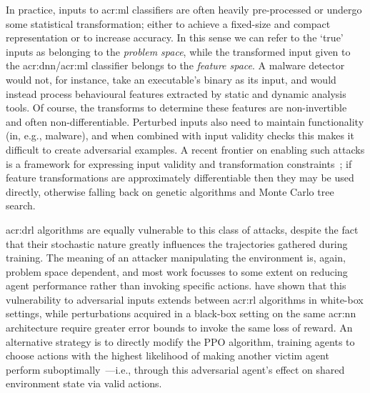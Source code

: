 In practice, inputs to \gls{acr:ml} classifiers are often heavily pre-processed or undergo some statistical transformation; either to achieve a fixed-size and compact representation or to increase accuracy.
In this sense we can refer to the `true' inputs as belonging to the \emph{problem space}, while the transformed input given to the \gls{acr:dnn}/\gls{acr:ml} classifier belongs to the \emph{feature space}.
A malware detector would not, for instance, take an executable's binary as its input, and would instead process behavioural features extracted by static and dynamic analysis tools. 
Of course, the transforms to determine these features are non-invertible and often non-differentiable.
Perturbed inputs also need to maintain functionality (in, e.g., malware), and when combined with input validity checks this makes it difficult to create adversarial examples.
A recent frontier on enabling such attacks is a framework for expressing input validity and transformation constraints~\parencite{DBLP:conf/sp/PierazziPCC20}; if feature transformations are approximately differentiable then they may be used directly, otherwise falling back on genetic algorithms and Monte Carlo tree search.

\gls{acr:drl} algorithms are equally vulnerable to this class of attacks, despite the fact that their stochastic nature greatly influences the trajectories gathered during training.
The meaning of an attacker manipulating the environment is, again, problem space dependent, and most work focusses to some extent on reducing agent performance rather than invoking specific actions.
\Textcite{DBLP:journals/corr/HuangPGDA17} have shown that this vulnerability to adversarial inputs extends between \gls{acr:rl} algorithms in white-box settings, while perturbations acquired in a black-box setting on the same \gls{acr:nn} architecture require greater error bounds to invoke the same loss of reward.
An alternative strategy is to directly modify the PPO algorithm, training agents to choose actions with the highest likelihood of making another victim agent perform suboptimally~\parencite{DBLP:conf/uss/Wu0WX21}---i.e., through this adversarial agent's effect on shared environment state via valid actions.


